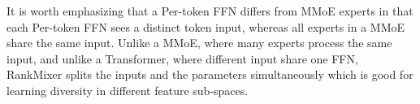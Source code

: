 It is worth emphasizing that a Per-token FFN differs from MMoE experts in that each Per-token FFN sees a distinct token input, whereas all experts in a MMoE share the same input.
Unlike a MMoE, where many experts process the same input, and unlike a Transformer, where different input share one FFN, RankMixer splits the inputs and the parameters simultaneously which is good for learning diversity in different feature sub-spaces.








